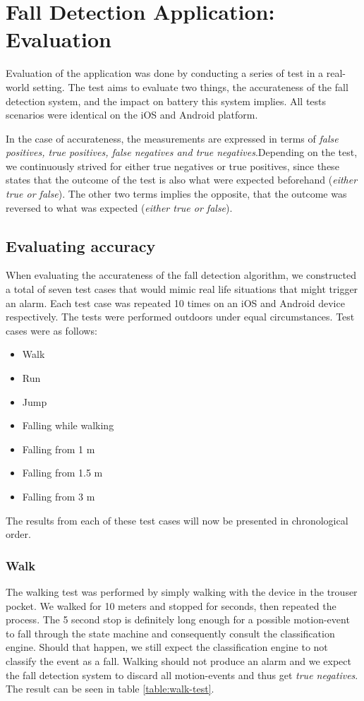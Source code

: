 \documentclass[12pt, a4paper, onecolumn]{article}
\begin{document}
	\newpage
	\section{Fall Detection Application: Evaluation} \label{section:application-evaluation}
	Evaluation of the application was done by conducting a series of test in a real-world setting. The test aims to evaluate two things, the accurateness of the fall detection system, and the impact on battery this system implies. All tests scenarios were identical on the iOS and Android platform. 
	
	In the case of accurateness, the measurements are expressed in terms of \textit{false positives, true positives, false negatives and true negatives}.Depending on the test, we continuously strived for either true negatives or true positives, since these states that the outcome of the test is also what were expected  beforehand (\textit{either true or false}). The other two terms implies the opposite, that the outcome was reversed to what was expected (\textit{either true or false}).
	
	
	
	\subsection{Evaluating accuracy} 
	When evaluating the accurateness of the fall detection algorithm, we constructed a total of seven test cases that would mimic real life situations that might trigger an alarm. Each test case was repeated 10 times on an iOS and Android device respectively. The tests were performed outdoors under equal circumstances. Test cases were as follows:
	
	\begin{itemize}
		\item Walk
		\item Run
		\item Jump
		\item Falling while walking
		\item Falling from 1 m
		\item Falling from 1.5 m
		\item Falling from 3 m
	\end{itemize}
	
	
	The results from each of these test cases will now be presented in chronological order. 
	
	\subsubsection{Walk} 
	\label{section:walking-test}
	The walking test was performed by simply walking with the device in the trouser pocket. We walked for 10 meters and stopped for  seconds, then repeated the process. The 5 second stop is definitely long enough for a possible motion-event to fall through the state machine and consequently consult the classification engine. Should that happen, we still expect the classification engine to not classify the event as a fall. Walking should not produce an alarm and we expect the fall detection system to discard all motion-events and thus get \textit{true negatives}. The result can be seen in table \ref{table:walk-test}. 
	
\end{document}

